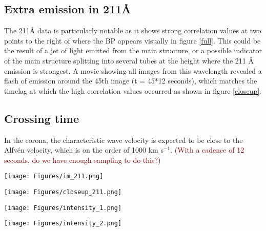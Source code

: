 \documentclass[preprint]{aastex}   %
\begin{document}
\subsection{Extra emission in 211\AA{}}
The 211\AA{} data is particularly notable as it shows strong correlation values
at two points to the right of where the BP appears visually in figure \ref{full}.
This could be the result of a jet of light emitted from the main structure, or a
possible indicator of the main structure splitting into several tubes at the
height where the 211 \AA{} emission is strongest.
A movie showing all images from this wavelength
revealed a flash
of emission around the 45th image (t = 45*12 seconds),
which matches the timelag at which the high correlation values occurred as shown
in figure \ref{closeup}.

\subsection{Crossing time}
In the corona, the characteristic wave velocity is expected to be close to
the Alfv\'en velocity, which is on the order of 1000 km s$^{-1}$.
\textcolor{darkred}{(With a
cadence of 12 seconds, do we have enough sampling to do this?)}


\begin{figure*}[htb!]
    \texttt{[image: Figures/im\_211.png]}
    \caption{Images from the 211 \AA{} bandpass only, around the times when the
        two jets of light appeared in the upper right region of the main body of the BP. }
    \label{211_images}
\end{figure*}

\begin{figure*}[htb!]
    \texttt{[image: Figures/closeup\_211.png]}
    \caption{Timelag at 211 \AA{} ``zoomed in'' around the two jets of light.}
    \label{closeup}
\end{figure*}

\begin{figure*}[htb!]
    \texttt{[image: Figures/intensity\_1.png]}
    \caption{Intensity of each pixel is plotted as a function of radius for each
        passband. I have no idea what's going on with the 94\AA{} data.}
    \label{intensity_1}
\end{figure*}

\begin{figure*}[htb!]
    \texttt{[image: Figures/intensity\_2.png]}
    \caption{Same as figure \ref{intensity_1}, but with half the radius range
        cut off to better view the values around the main BP.}
    \label{intensity_2}
\end{figure*}
\end{document}
